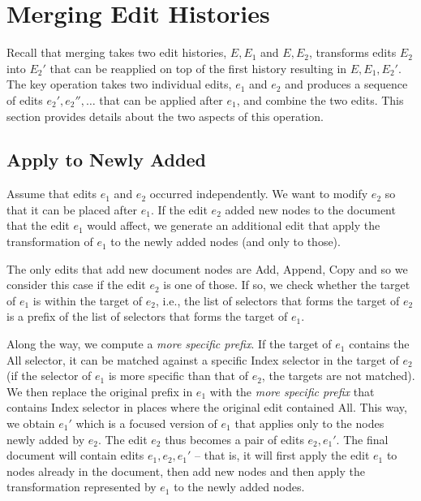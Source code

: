 \documentclass[sigconf,anonymous,screen]{acmart}
\newcommand{\ident}[1]{{\sffamily #1}}
\begin{document}
\section{Merging Edit Histories}
Recall that merging takes two edit histories, $E, E_1$ and $E, E_2$,
transforms edits $E_2$ into $E_2'$ that can be reapplied on top of the first history
resulting in $E, E_1, E_2'$. The key operation takes two individual edits, $e_1$ and $e_2$
and produces a sequence of edits $e_2', e_2'', \ldots$ that can be applied after $e_1$,
and combine the two edits. This section provides details about the two aspects of this operation.

\subsection{Apply to Newly Added}
\label{app:merge-apply-to-added}

Assume that edits $e_1$ and $e_2$ occurred independently. We want to modify $e_2$ so that
it can be placed after $e_1$. If the edit $e_2$ added new nodes to the document that the
edit $e_1$ would affect, we generate an additional edit that apply the transformation of $e_1$
to the newly added nodes (and only to those).

The only edits that add new document nodes are \ident{Add}, \ident{Append}, \ident{Copy} and
so we consider this case if the edit $e_2$ is one of those. If so, we check
whether the target of $e_1$ is within the target of $e_2$, i.e., the list of selectors that
forms the target of $e_2$ is a prefix of the list of selectors that forms the target of $e_1$.

Along the way, we compute a \emph{more specific prefix}. If the target of $e_1$ contains
the \ident{All} selector, it can be matched against a specific \ident{Index} selector in the
target of $e_2$ (if the selector of $e_1$ is more specific than that of $e_2$, the targets
are not matched). We then replace the original prefix in $e_1$ with the \emph{more specific prefix}
that contains \ident{Index} selector in places where the original edit contained \ident{All}.
This way, we obtain $e_1'$ which is a focused version of $e_1$ that applies only to the
nodes newly added by $e_2$. The edit $e_2$ thus becomes a pair of edits $e_2, e_1'$.
The final document will contain edits $e_1, e_2, e_1'$ -- that is, it will first apply the edit
$e_1$ to nodes already in the document, then add new nodes and then apply the transformation
represented by $e_1$ to the newly added nodes.
\end{document}
